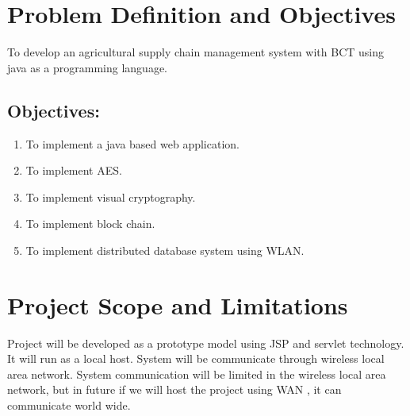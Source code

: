 \documentclass[oneside,a4paper,12pt]{report}
\begin{document}
\section{Problem Definition and Objectives}
To develop an agricultural supply chain management system with BCT using java as a programming language.
\subsection{Objectives:}
\begin{enumerate}
\item To implement a java based web application.
\item To implement AES.
\item To implement visual cryptography.
\item To implement block chain.
\item To implement distributed database system using WLAN.
\end{enumerate}
\section{Project Scope and Limitations}

Project will be developed as a prototype model using JSP and servlet technology. It will run as a local host. System will be communicate through wireless local area network. System communication will be limited in the wireless local area network, but in future if we will host the project using WAN , it can communicate world wide. 
\end{document}
